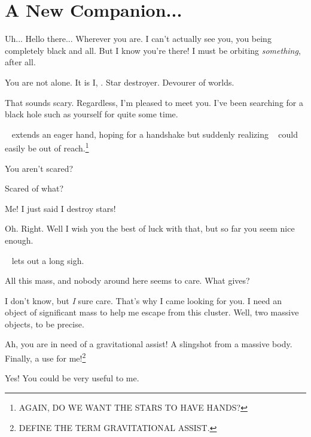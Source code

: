 \documentclass[main.tex]{subfiles}
\begin{document}
\section{A New Companion...}

\par \Sterope Uh... Hello there... Wherever you are.  I can't actually see you, you being completely black and all.  But I know you're there!  I must be orbiting \textit{something}, after all.

\par \Ares You are not alone.  It is I, \rmares.  Star destroyer.  Devourer of worlds.

\par \Sterope That sounds scary.  Regardless, I'm pleased to meet you.  I've been searching for a black hole such as yourself for quite some time.

\par \nar \rmsterope~ extends an eager hand, hoping for a handshake but suddenly realizing \rmares~ could easily be out of reach.\footnote{AGAIN, DO WE WANT THE STARS TO HAVE HANDS?}

\par \Ares You aren't scared?

\par \Sterope Scared of what?

\par \Ares Me!  I just said I destroy stars!

\par \Sterope Oh.  Right.  Well I wish you the best of luck with that, but so far you seem nice enough.

\par \nar \rmares~ lets out a long sigh.

\par \Ares All this mass, and nobody around here seems to care.  What gives?

\par \Sterope I don't know, but \textit{I} sure care.  That's why I came looking for you.  I need an object of significant mass to help me escape from this cluster.  Well, two massive objects, to be precise.  

\par \Ares Ah, you are in need of a gravitational assist!  A slingshot from a massive body.  Finally, a use for me!\footnote{DEFINE THE TERM GRAVITATIONAL ASSIST.}

\par \Sterope Yes!  You could be very useful to me.  
\end{document}
